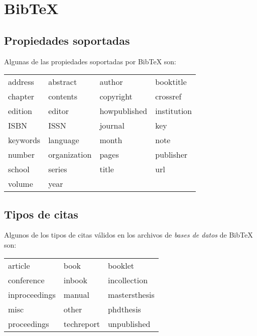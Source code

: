 
\chapter[Apendice A. Bib\TeX{}]{Bib\TeX{}}

\section{Propiedades soportadas}

Algunas de las propiedades soportadas por Bib\TeX{} son:

\begin{tabular}{llll}
address & abstract & author & booktitle \\
chapter & contents & copyright & crossref \\
edition & editor & howpublished & institution \\
ISBN & ISSN & journal & key \\
keywords & language & month & note \\
number & organization & pages & publisher \\
school & series & title &url \\
volume & year & & 
\end{tabular}

\newpage

\section{Tipos de citas}

Algunos de los tipos de citas válidos en los archivos de 
\emph{bases de datos} de Bib\TeX{} son:

\begin{tabular}{lll}
article & book & booklet \\
conference & inbook & incollection \\
inproceedings & manual & mastersthesis \\
misc & other & phdthesis \\
proceedings & techreport & unpublished
\end{tabular}
